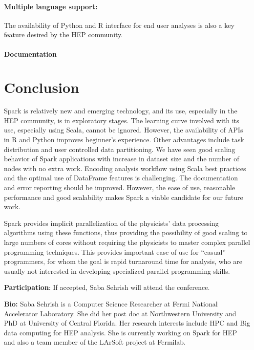 \documentclass[11pt, twocolumn]{article}
\begin{document}
\paragraph{Multiple language support: }
The availability of Python and R interface for end user analyses is also a key feature desired by the HEP community.


\paragraph{Documentation} 

\section{Conclusion}
Spark is relatively new and emerging technology, and its use, especially 
in the HEP community, is in exploratory stages. The learning curve involved 
with its use, especially using Scala, cannot be ignored. However, the availability 
of APIs in R and Python improves beginner's experience. 
Other advantages include task distribution and user controlled 
data partitioning. We have seen good scaling behavior of Spark applications 
with increase in dataset size and the number of nodes with no extra work. 
Encoding analysis workflow using Scala best practices and the optimal 
use of DataFrame features is challenging. The documentation 
and error reporting should be improved. However, the ease of use, 
reasonable performance and good scalability makes Spark a viable candidate for our future work.

Spark provides implicit parallelization of the
physicists' data processing algorithms using these functions, thus providing the possibility
of good scaling to large numbers of cores without requiring the
physicists to master complex parallel programming techniques. This
provides important ease of use for ``casual'' programmers, for whom
the goal is rapid turnaround time for analysis, who are usually not
interested in developing specialized parallel programming
skills. 

\textbf{Participation}: If accepted, Saba Sehrish will attend the conference. 

\textbf{Bio:} 
Saba Sehrish is a Computer Science Researcher 
at Fermi National Accelerator Laboratory. She did her post doc at Northwestern University
and PhD at University of Central Florida. 
Her research interests include HPC and Big data computing for HEP analysis.  
She is currently working on Spark for HEP and also a team member of the LArSoft 
project at Fermilab. 
\end{document}
